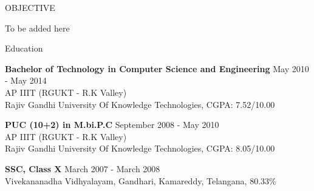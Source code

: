 \documentclass{resume} %
\begin{document}

\begin{rSection}{OBJECTIVE}
  
  { To be added here }


\end{rSection}

\begin{rSection}{Education}

{\bf Bachelor of Technology in Computer Science and Engineering} \hfill {May 2010 - May 2014}
\\ 
AP IIIT (RGUKT - R.K Valley)
\\
Rajiv Gandhi University Of Knowledge Technologies,  CGPA: 7.52/10.00  

{\bf PUC (10+2) in M.bi.P.C} \hfill {September 2008 - May 2010}
\\
AP IIIT (RGUKT - R.K Valley)
\\
Rajiv Gandhi University Of Knowledge Technologies,  CGPA: 8.05/10.00  

{\textbf{SSC, Class X}}  \hfill March 2007 - March  2008\\
Vivekananadha Vidhyalayam, Gandhari, Kamareddy, Telangana, 80.33\% 


\end{rSection}
\end{document}
